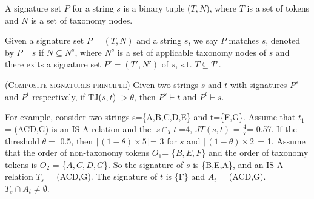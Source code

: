 %
%
%


%
%

A signature set $P$ for a string $s$ is a binary tuple ($T,N$), where $T$ is a set of tokens and $N$ is a set of taxonomy nodes.

\begin{definition} 
Given a signature set $P = (T,N)$ and a string $s$, we say $P$ matches $s$, denoted by $P \vdash s$ if $N \subseteq N^s$, where $N^s$ is a set of applicable taxonomy nodes of $s$ and  there exits a signature set $P' = (T',N')$ of $s$, s.t. $T \subseteq T'$.
\end{definition}


\begin{lem} (\textsc{Composite signatures principle})  Given two strings $s$ and $t$ with signatures $P^s$ and $P^t$ respectively, if TJ($s, t$) $> \theta$, then $P^s \vdash t$ and $P^t \vdash s$.

\end{lem}

For example, consider two strings s=\{A,B,C,D,E\} and t=\{F,G\}. Assume that $t_1$ = (ACD,G) is an IS-A relation and the $|s \cap_T t| $=4, $JT(s,t)$ = $\frac{4}{7}$= 0.57.
If the threshold $\theta =$ 0.5, then  $\lceil (1-\theta) \times 5 \rceil$= 3 for $s$ and $\lceil (1-\theta) \times 2 \rceil$= 1. Assume that the order of non-taxonomy tokens $O_1$= \{$B, E, F$\} and the order of taxonomy tokens is $O_2$ = \{$A, C, D, G$\}. So the signature of $s$ is \{B,E,A\}, and an IS-A relation $T_s$ = (ACD,G). The signature of $t$ is \{F\} and $A_t$ = (ACD,G). $ T_s \cap A_t \neq \emptyset$.

